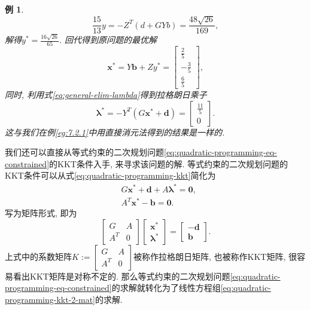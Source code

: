 \documentclass{SBCbookchapter}
\newcommand{\V}[1]{{\bm{#1}}}
\newtheorem{eg}[thm]{例}
\numberwithin{equation}{section}
\begin{document}
\begin{eg}
\begin{equation*}
\frac{15}{13} y = - Z^T \left( d + G Y b \right) = \frac{48 \sqrt{26}}{169},
\end{equation*}
解得$y^* = \frac{16 \sqrt{26}}{65}.$ 回代得到原问题的最优解
\begin{equation*}
\V{x}^* = Y \V{b} + Z y^* = \left[\begin{matrix} \frac{2}{5} \\ - \frac{3}{5} \\ \frac{6}{5} \end{matrix}\right],
\end{equation*}
同时, 利用式\eqref{eq:general-elim-lambda}得到拉格朗日乘子
\begin{equation*}
\V{\lambda}^* = - Y^T \left( G \V{x}^* + \V{d} \right) = \left[\begin{matrix} \frac{11}{5} \\ 0 \end{matrix}\right].
\end{equation*}
这与我们在例\eqref{eg:7.2.1}中用直接消元法得到的结果是一样的.
\end{eg}

我们还可以直接从等式约束的二次规划问题\eqref{eq:quadratic-programming-eq-constrained}的KKT条件入手, 来寻求该问题的解. 等式约束的二次规划问题的KKT条件可以从式\eqref{eq:quadratic-programming-kkt}简化为
\begin{equation}
\label{eq:quadratic-programming-kkt-2}
\begin{aligned}
& G \V{x}^* + \V{d} + A \V{\lambda}^* = \V{0}, \\
& A^T \V{x}^* - \V{b} = \V{0}.
\end{aligned}
\end{equation}
写为矩阵形式, 即为
\begin{equation}
\label{eq:quadratic-programming-kkt-2-mat}
\begin{bmatrix} G & A \\ A^T & 0 \end{bmatrix} \begin{bmatrix} \V{x}^* \\ \V{\lambda}^* \end{bmatrix} = \begin{bmatrix} -\V{d} \\ \V{b} \end{bmatrix}.
\end{equation}
上式中的系数矩阵$K := \begin{bmatrix} G & A \\ A^T & 0 \end{bmatrix}$被称作拉格朗日矩阵, 也被称作KKT矩阵, 很容易看出KKT矩阵是对称不定的. 那么等式约束的二次规划问题\eqref{eq:quadratic-programming-eq-constrained}的求解就转化为了线性方程组\eqref{eq:quadratic-programming-kkt-2-mat}的求解.
\end{document}
